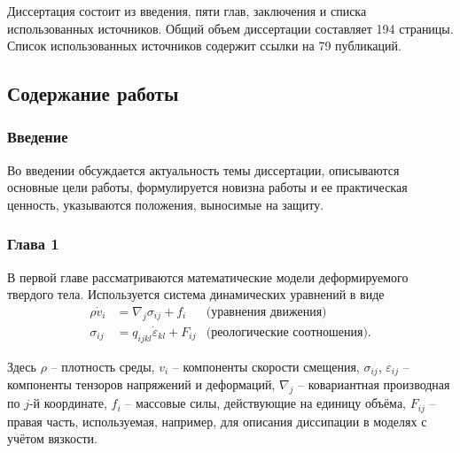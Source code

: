 Диссертация состоит из введения, пяти глав, заключения и списка использованных источников. Общий объем диссертации составляет 194 страницы. Список использованных источников содержит ссылки на 79 публикаций.

\subsection*{Содержание работы}



\subsubsection*{Введение}

Во введении обсуждается актуальность темы диссертации, описываются основные цели работы, формулируется новизна работы и ее практическая ценность, указываются положения, выносимые на защиту.

\subsubsection*{Глава 1}

В первой главе рассматриваются математические модели деформируемого твердого тела. Используется система динамических уравнений в виде
\begin{align}
\label{initial_equations}
\rho\dot{v}_i &= \nabla_j\sigma_{ij}+f_i & \textrm{(уравнения движения)}\nonumber\\
\sigma_{ij} &= q_{ijkl}\dot{\varepsilon}_{kl}+F_{ij} & \textrm{(реологические
соотношения).}
\end{align}

Здесь $\rho$ – плотность среды, $v_i$ – компоненты скорости смещения,
$\sigma_{ij}$, $\varepsilon_{ij}$ -- компоненты тензоров напряжений и деформаций,
$\nabla_j$ – ковариантная производная по $j$-й координате, $f_i$ – массовые
силы, действующие на единицу объёма, $F_{ij}$ -- правая часть, используемая, например, для описания диссипации в моделях с учётом вязкости.

